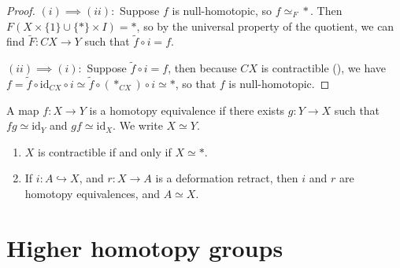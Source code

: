 \documentclass[ma3408.tex]{subfiles}
\begin{document}
\begin{proof}
$(i) \implies (ii): $ Suppose $f$ is null-homotopic, so $f \simeq_F \ast$. Then $F(X\times \{ 1 \} \cup \{ \ast \} \times I) = \ast$, so by the universal property of the quotient, we can find $\tilde F \colon CX \to Y$ such that $\tilde f \circ i = f$. 

$(ii) \implies (i): $ Suppose $\tilde f \circ i = f$, then because $CX$ is contractible (), we have $f = \tilde f \circ \text{id}_{CX} \circ i \simeq \tilde f \circ (\ast_{CX}) \circ i \simeq \ast$, so that $f$ is null-homotopic. 
\end{proof}
\begin{Def}
A map $f \colon X \to Y$ is a homotopy equivalence if there exists $g \colon Y \to X$ such that $fg \simeq \text{id}_Y$ and $gf \simeq \text{id}_X$. We write $X \simeq Y$. 
\end{Def}
\begin{Exa}
\begin{enumerate}[label=(\roman*)]
	\item $X$ is contractible if and only if $X \simeq \ast$. 
	\item If $i \colon A \hookrightarrow X$, and $r \colon X \to A$ is a deformation retract, then $i$ and $r$ are homotopy equivalences, and $A \simeq X$. 
\end{enumerate}
\end{Exa}
\section{Higher homotopy groups}
\end{document}
